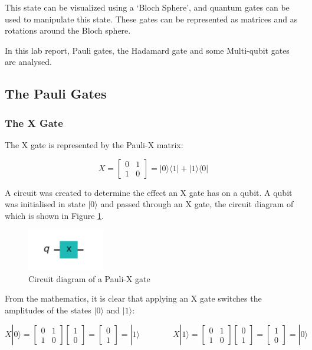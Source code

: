 This state can be visualized using a `Bloch Sphere', and quantum gates can be used to manipulate this state. These gates can be represented as matrices and as rotations around the Bloch sphere.

In this lab report, Pauli gates, the Hadamard gate and some Multi-qubit gates are analysed.

\subsection{The Pauli Gates}

\subsubsection{The X Gate}
The X gate is represented by the Pauli-X matrix:

$$ X = \begin{bmatrix} 0 & 1 \\ 1 & 0 \end{bmatrix} = |0\rangle\langle1| + |1\rangle\langle0| $$

A circuit was created to determine the effect an X gate has on a qubit. A qubit was initialised in state $|0\rangle$ and passed through an X gate, the circuit diagram of which is shown in Figure \ref{fig:xGate}.

\begin{figure}[h]
    \centering
    \includegraphics[width=0.3\textwidth]{lab2/images/xGate.png}
    \captionsetup{font = it, labelfont = bf, width=.91\linewidth, justification=centering}
    \caption{Circuit diagram of a Pauli-X gate} 
    \label{fig:xGate}
\end{figure}

From the mathematics, it is clear that applying an X gate switches the amplitudes of the states $|0\rangle$ and $|1\rangle$:

$$ X|0\rangle = \begin{bmatrix} 0 & 1 \\ 1 & 0 \end{bmatrix}\begin{bmatrix} 1 \\ 0 \end{bmatrix} = \begin{bmatrix} 0 \\ 1 \end{bmatrix} = |1\rangle \quad\quad\quad\quad
X|1\rangle = \begin{bmatrix} 0 & 1 \\ 1 & 0 \end{bmatrix}\begin{bmatrix} 0 \\ 1 \end{bmatrix} = \begin{bmatrix} 1 \\ 0 \end{bmatrix} = |0\rangle$$


